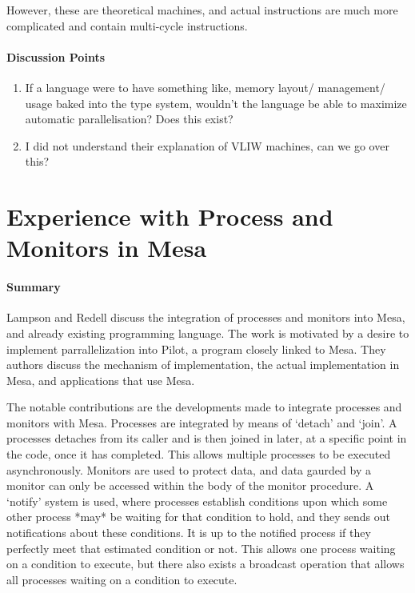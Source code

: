 However, these are theoretical machines, and actual instructions are much more
complicated and contain multi-cycle instructions.

\paragraph{\textbf{Discussion Points}}
\begin{enumerate}
    \item If a language were to have something like, memory layout/ management/
    usage baked into the type system, wouldn't the language be able to maximize
    automatic parallelisation? Does this exist?
    \item I did not understand their explanation of VLIW machines, can we go
    over this?
\end{enumerate}

\section {Experience with Process and Monitors in Mesa
\cite{lampson1980experience}}

\paragraph{\textbf{Summary}}
Lampson and Redell discuss the integration of processes and monitors into Mesa,
and already existing programming language. The work is motivated by a desire to
implement parrallelization into Pilot, a program closely linked to Mesa. They
authors discuss the mechanism of implementation, the actual implementation in
Mesa, and applications that use Mesa.

The notable contributions are the developments made to integrate processes and
monitors with Mesa. Processes are integrated by means of `detach' and `join'.
A processes detaches from its caller and is then joined in later, at a specific
point in the code, once it has completed. This allows multiple processes to be
executed asynchronously. Monitors are used to protect data, and data gaurded by
a monitor can only be accessed within the body of the monitor procedure. A
`notify' system is used, where processes establish conditions upon which some
other process *may* be waiting for that condition to hold, and they sends out
notifications about these conditions. It is up to the notified process if they
perfectly meet that estimated condition or not. This allows one process waiting
on a condition to execute, but there also exists a broadcast operation that
allows all processes waiting on a condition to execute.

